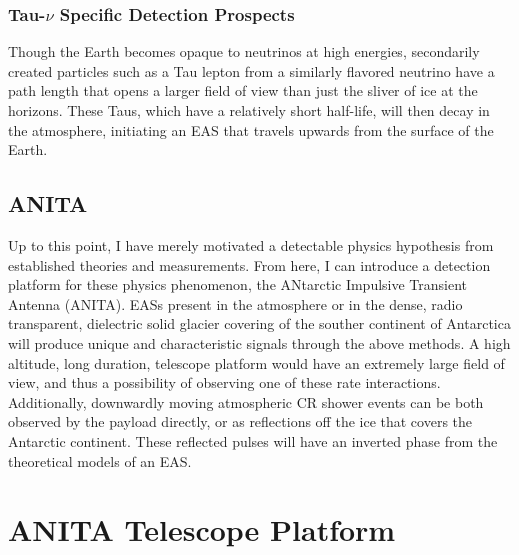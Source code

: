 	\subsection{Tau-$\nu$ Specific Detection Prospects}
		Though the Earth becomes opaque to neutrinos at high energies, secondarily created particles such as a Tau lepton from a similarly flavored neutrino have a path length that opens a larger field of view than just the sliver of ice at the horizons.  These Taus, which have a relatively short half-life, will then decay in the atmosphere, initiating an EAS that travels upwards from the surface of the Earth.

\section{ANITA}
	Up to this point, I have merely motivated a detectable physics hypothesis from established theories and measurements.  From here, I can introduce a detection platform for these physics phenomenon, the ANtarctic Impulsive Transient Antenna (ANITA).  EASs present in the atmosphere or in the dense, radio transparent, dielectric solid glacier covering of the souther continent of Antarctica will produce unique and characteristic signals through the above methods.  A high altitude, long duration, telescope platform would have an extremely large field of view, and thus a possibility of observing one of these rate interactions.  Additionally, downwardly moving atmospheric CR shower events can be both observed by the payload directly, or as reflections off the ice that covers the Antarctic continent.  These reflected pulses will have an inverted phase from the theoretical models of an EAS.



\chapter{ANITA Telescope Platform}
